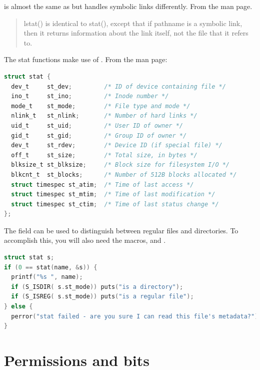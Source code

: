  is almost the same as  but handles symbolic links differently.
From the  man page.

\begin{quote}
    lstat() is identical to stat(), except that if pathname is a symbolic link, then it returns information about the link itself, not the file that it refers to.
\end{quote}

The stat functions make use of .
From the  man page:

\begin{lstlisting}[language=C]
struct stat {
  dev_t     st_dev;         /* ID of device containing file */
  ino_t     st_ino;         /* Inode number */
  mode_t    st_mode;        /* File type and mode */
  nlink_t   st_nlink;       /* Number of hard links */
  uid_t     st_uid;         /* User ID of owner */
  gid_t     st_gid;         /* Group ID of owner */
  dev_t     st_rdev;        /* Device ID (if special file) */
  off_t     st_size;        /* Total size, in bytes */
  blksize_t st_blksize;     /* Block size for filesystem I/O */
  blkcnt_t  st_blocks;      /* Number of 512B blocks allocated */
  struct timespec st_atim;  /* Time of last access */
  struct timespec st_mtim;  /* Time of last modification */
  struct timespec st_ctim;  /* Time of last status change */
};
\end{lstlisting}

The  field can be used to distinguish between regular files and directories.
To accomplish this, you will also need the macros,  and .

\begin{lstlisting}[language=C]
struct stat s;
if (0 == stat(name, &s)) {
  printf("%s ", name);
  if (S_ISDIR( s.st_mode)) puts("is a directory");
  if (S_ISREG( s.st_mode)) puts("is a regular file");
} else {
  perror("stat failed - are you sure I can read this file's metadata?");
}
\end{lstlisting}

\section{Permissions and bits}

